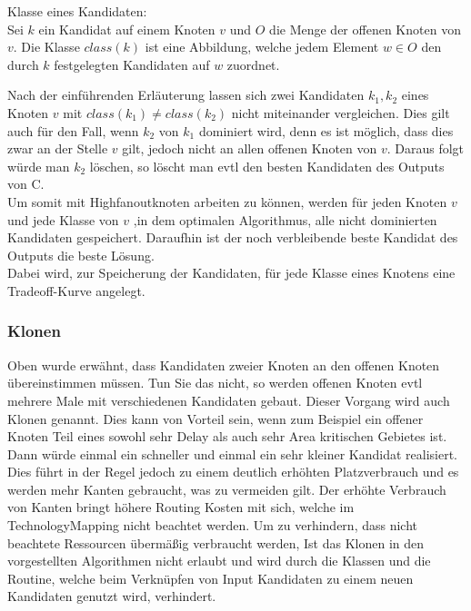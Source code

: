 \documentclass[11pt, a4paper, german]{article}
\newcommand{\TM}{TechnologyMapping }
\begin{document}
\begin{definition}{Klasse eines Kandidaten:}\\
	Sei $k$ ein Kandidat auf einem Knoten $v$ und $O$ die Menge der offenen Knoten von $v$. Die Klasse $class(k)$ ist eine Abbildung, welche jedem Element $w \in O$ den durch $k$ festgelegten Kandidaten auf $w$ zuordnet.\\
\end{definition}
Nach der einführenden Erläuterung lassen sich zwei Kandidaten $k_1,k_2$ eines Knoten $v$ mit $class(k_1) \neq class(k_2)$ nicht miteinander vergleichen. Dies gilt auch für den Fall, wenn $k_2$ von  $k_1$ dominiert wird, denn es ist möglich, dass dies zwar an der Stelle $v$ gilt, jedoch nicht an allen offenen Knoten von $v$. Daraus folgt würde man $k_2$ löschen, so löscht man evtl den besten Kandidaten des Outputs von C. \\
Um somit mit Highfanoutknoten arbeiten zu können, werden für jeden Knoten $v$ und jede Klasse von $v$ ,in dem optimalen Algorithmus, alle nicht dominierten Kandidaten gespeichert. Daraufhin ist der noch verbleibende beste Kandidat des Outputs die beste Lösung.\\
Dabei wird, zur Speicherung der Kandidaten, für jede Klasse eines Knotens eine Tradeoff-Kurve angelegt.

\subsubsection{Klonen}
Oben wurde erwähnt, dass Kandidaten zweier Knoten an den offenen Knoten übereinstimmen müssen. Tun Sie das nicht, so werden offenen Knoten evtl mehrere Male mit verschiedenen Kandidaten gebaut. Dieser Vorgang wird auch Klonen genannt. Dies kann von Vorteil sein, wenn zum Beispiel ein offener Knoten Teil eines sowohl sehr Delay als auch sehr Area kritischen Gebietes ist. Dann würde einmal ein schneller und einmal ein sehr kleiner Kandidat realisiert. Dies führt in der Regel jedoch zu einem deutlich erhöhten Platzverbrauch und es werden mehr Kanten gebraucht, was zu vermeiden gilt. Der erhöhte Verbrauch von Kanten bringt höhere Routing Kosten mit sich, welche im \TM nicht beachtet werden. Um zu verhindern, dass nicht beachtete Ressourcen übermäßig verbraucht werden, Ist das Klonen in den vorgestellten Algorithmen nicht erlaubt und wird durch die Klassen und die Routine, welche beim Verknüpfen von Input Kandidaten zu einem neuen Kandidaten genutzt wird, verhindert. 
\end{document}
